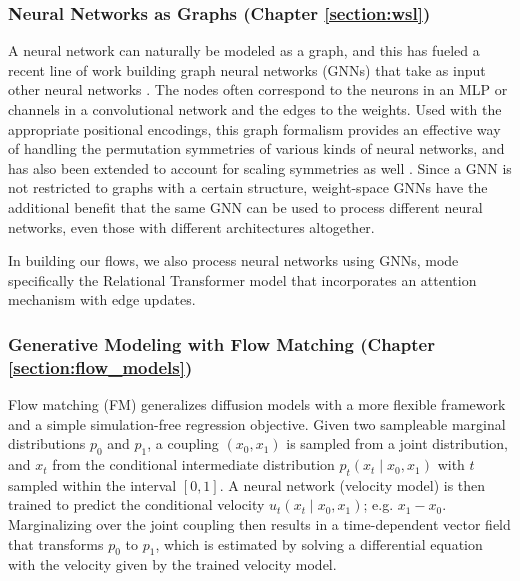 \subsubsection{Neural Networks as Graphs (Chapter \ref{section:wsl})}

A neural network can naturally be modeled as a graph, and this has fueled a recent line of work building graph neural networks (GNNs) that take as input other neural networks \citep{kofinasGraphNeuralNetworks2024,limGraphMetanetworksProcessing2023,kalogeropoulosScaleEquivariantGraph2024}. The nodes often correspond to the neurons in an MLP or channels in a convolutional network and the edges to the weights. Used with the appropriate positional encodings, this graph formalism provides an effective way of handling the permutation symmetries of various kinds of neural networks, and has also been extended to account for scaling symmetries as well \citep{kalogeropoulosScaleEquivariantGraph2024}. Since a GNN is not restricted to graphs with a certain structure, weight-space GNNs have the additional benefit that the same GNN can be used to process different neural networks, even those with different architectures altogether.

In building our flows, we also process neural networks using GNNs, mode specifically the Relational Transformer model \citep{diaoRelationalAttentionGeneralizing2023} that incorporates an attention mechanism with edge updates. 

\subsubsection{Generative Modeling with Flow Matching (Chapter \ref{section:flow_models})}

Flow matching (FM) \citep{lipmanFlowMatchingGenerative2023,albergoStochasticInterpolantsUnifying2023,liuFlowStraightFast2022,tongImprovingGeneralizingFlowbased2023} generalizes diffusion models with a more flexible framework and a simple simulation-free regression objective. Given two sampleable marginal distributions $p_0$ and $p_1$, a coupling $(x_0, x_1)$ is sampled from a joint distribution, and $x_t$ from the conditional intermediate distribution $p_t(x_t \mid x_0, x_1)$ with $t$ sampled within the interval $[0,1]$. A neural network (velocity model) is then trained to predict the conditional velocity $u_t(x_t \mid x_0, x_1)$; e.g. $x_1 - x_0$. Marginalizing over the joint coupling then results in a time-dependent vector field that transforms $p_0$ to $p_1$, which is estimated by solving a differential equation with the velocity given by the trained velocity model. 

